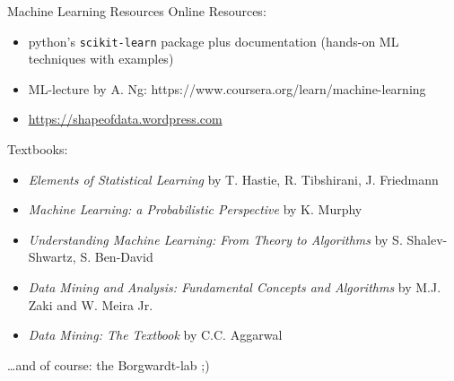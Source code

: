 \documentclass[aspectratio=169]{beamer}
\begin{document}
\begin{frame}{Machine Learning Resources}
    \scriptsize
    Online Resources:
    \begin{itemize}
        \item python's \texttt{scikit-learn} package plus documentation (hands-on ML techniques with examples)
        \item ML-lecture by A. Ng: https://www.coursera.org/learn/machine-learning
        \item \url{https://shapeofdata.wordpress.com}
    \end{itemize}
    \vspace{0.5cm}
    Textbooks:
    \begin{itemize}
        \item \textit{Elements of Statistical Learning} by T. Hastie, R. Tibshirani, J. Friedmann
        \item \textit{Machine Learning: a Probabilistic Perspective} by K. Murphy
        \item \textit{Understanding Machine Learning: From Theory to Algorithms} by S. Shalev-Shwartz, S. Ben-David
        \item \textit{Data Mining and Analysis: Fundamental Concepts and Algorithms} by  M.J. Zaki and W. Meira Jr.
        \item \textit{Data Mining: The Textbook} by C.C. Aggarwal
    \end{itemize}
    \vspace{0.5cm}
    \dots and of course: the Borgwardt-lab ;)
\end{frame}
\end{document}
